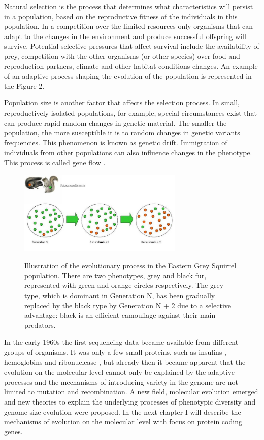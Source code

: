 \documentclass[11pt, a4paper,oneside]{report}
\begin{document}
Natural selection is the process that determines what characteristics will persist in a population, based on the reproductive fitness of the individuals in this population. In a competition over the limited resources only organisms that can adapt to the changes in the environment and produce successful offspring will survive. Potential selective pressures that affect survival include the availability of prey, competition with the other organisms (or other species) over food and reproduction partners, climate and other habitat conditions changes. An example of an adaptive process shaping the evolution of the population is represented in the Figure 2.

Population size is another factor that affects the selection process.  In small, reproductively isolated populations, for example, special circumstances exist that can produce rapid random changes in genetic material. The smaller the population, the more susceptible it is to random changes in genetic variants frequencies.  This phenomenon is known as genetic drift. Immigration of individuals from other populations can also influence changes in the phenotype. This process is called gene flow \cite{Grant1980}.

\begin{figure}[t]
\begin{center}
\label{img:populations}
\includegraphics[width=0.7\textwidth]{figures/squirrel.jpg}
\end{center}
\caption{ Illustration of the evolutionary process in the Eastern Grey Squirrel population. There are two phenotypes, grey and black fur, represented with green and orange circles respectively. The grey type, which is dominant in Generation N, has been gradually replaced by the black type by Generation N + 2 due to a selective advantage: black is an efficient camouflage against their main predators.} 
\end{figure}

In the early 1960s the first sequencing data became available from different groups of organisms. It was only a few small proteins, such as insulins \cite{Sanger1945}, hemoglobins \cite{INGRAM1956} and ribonuclease \cite{Kartha1967}, but already then it became apparent that the evolution on the molecular level cannot only be explained by the adaptive processes and the mechanisms of introducing variety in the genome are not limited to mutation and recombination. A new field, molecular evolution emerged and new theories to explain the underlying processes of phenotypic diversity and genome size evolution were proposed.  In the next chapter I will describe the mechanisms of evolution on the molecular level with focus on protein coding genes. 
\end{document}
